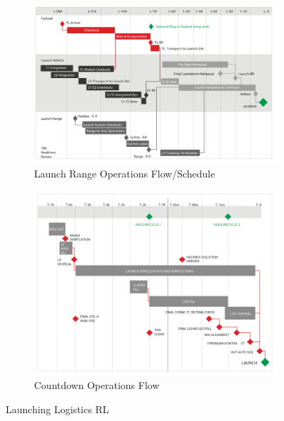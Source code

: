 \begin{figure}{}
    \centering
    \begin{subfigure}[!ht]{0.8\textwidth}
        \includegraphics[width=\textwidth]{./Sections_CD/S4-First_Placement/Images_S4/Picture_1_S4.png}
        \caption{Launch Range Operations Flow/Schedule}
        \label{fig:gantt1}
    \end{subfigure}
    \begin{subfigure}[!ht]{0.8\textwidth}
        \includegraphics[width=\textwidth]{./Sections_CD/S4-First_Placement/Images_S4/Picture_2_S4.png}
        \caption{Countdown Operations Flow}
        \label{fig:gantt2}
    \end{subfigure}
    \caption{Launching Logistics RL}\label{fig:animals}
\end{figure}


